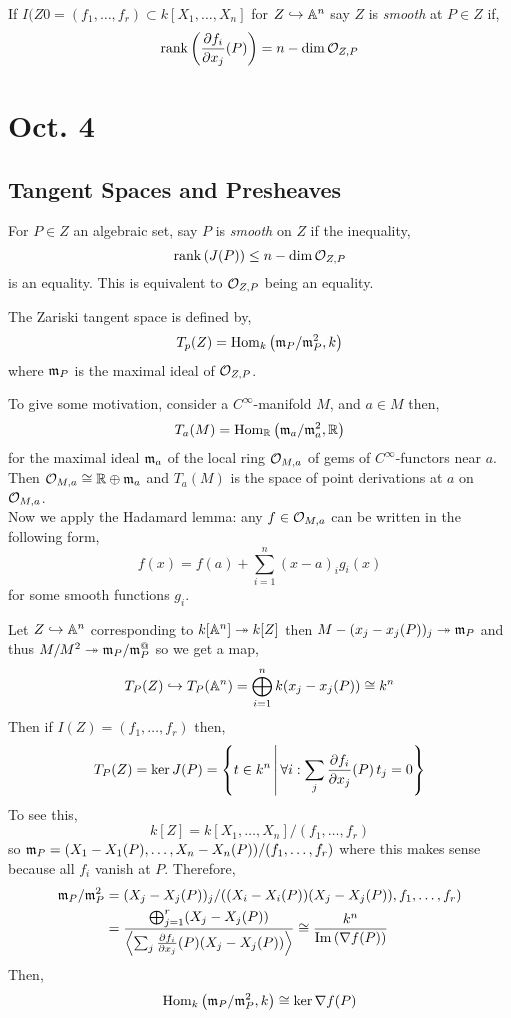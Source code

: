 \documentclass[12pt]{article}
\begin{document}
\begin{defn}
If $I(Z0 = (f_1, \dots, f_r) \subset k[X_1, \dots, X_n]$ for $Z \hookrightarrow \mathbb{A}^n$ say $Z$ is \textit{smooth} at $P \in Z$ if,
\[ \mathrm{rank} \left( \frac{\partial{f_i}}{\partial{x_j}} (P) \right) = n - \dim{ \mathcal{O}_{Z, P}} \]
\end{defn}

\section{Oct. 4}

\subsection{Tangent Spaces and Presheaves}

For $P \in Z$ an algebraic set, say $P$ is \textit{smooth} on $Z$ if the inequality,
\[ \operatorname{\mathrm{rank}}{(J(P))} \le n - \dim{\mathcal{O}_{Z, P}} \]
is an equality. This is equivalent to $\mathcal{O}_{Z, P}$ being an equality.

\begin{defn}
The Zariski tangent space is defined by,
\[ T_p(Z) = \mathrm{Hom}_{k} \left( \mathfrak{m}_P/\mathfrak{m}_P^2, k \right) \]
where $\mathfrak{m}_P$ is the maximal ideal of $\mathcal{O}_{Z, P}$.
\end{defn}

\begin{rmk}
To give some motivation, consider a $C^\infty$-manifold $M$, and $a \in M$ then,
\[ T_a(M) = \mathrm{Hom}_{\mathbb{R}} \left( \mathfrak{m}_a/\mathfrak{m}_a^2, \mathbb{R} \right) \]
for the maximal ideal $\mathfrak{m}_a$ of the local ring $\mathcal{O}_{M, a}$ of gems of $C^\infty$-functors near $a$. Then $\mathcal{O}_{M, a} \cong \mathbb{R} \oplus \mathfrak{m}_a$ and $T_a(M)$ is the space of point derivations at $a$ on $\mathcal{O}_{M, a}$.
\bigskip\\
Now we apply the Hadamard lemma: any $f \in \mathcal{O}_{M, a}$ can be written in the following form,
\[ f(x) = f(a) + \sum_{i = 1}^n (x - a)_i g_i(x) \]
for some smooth functions $g_i$.
\end{rmk}

\begin{example}
Let $Z \hookrightarrow \mathbb{A}^n$ corresponding to $k[\mathbb{A}^n] \twoheadrightarrow k[Z]$ then $M - (x_j - x_j(P))_j \twoheadrightarrow \mathfrak{m}_P$ and thus $M/M^2 \twoheadrightarrow \mathfrak{m}_P / \mathfrak{m}_P^@$ so we get a map,
\[ T_P(Z) \hookrightarrow T_P(\mathbb{A}^n) = \bigoplus_{i = 1}^n k (x_j - x_j(P)) \cong k^n \]
Then if $I(Z) = (f_1, \dots, f_r)$ then,
\[ T_P(Z) = \ker{J(P)} = \left\{ t \in k^n \, \middle| \, \forall i : \sum_{j} \frac{\partial{f_i}}{\partial{x_j}}(P) \, t_j = 0 \right\} \]
To see this,
\[ k[Z] = k[X_1, \dots, X_n]/(f_1, \dots, f_r) \]
so $\mathfrak{m}_P = (X_1 - X_1(P), \dots, X_n - X_n(P)) / (f_1, \dots, f_r)$ where this makes sense because all $f_i$ vanish at $P$. Therefore,
\begin{align*}
\mathfrak{m}_P / \mathfrak{m}_P^2 & = (X_j - X_j(P))_j / ((X_i - X_i(P))(X_j - X_j(P)), f_1, \dots, f_r)
\\
& = \frac{\bigoplus_{j = 1}^r (X_j - X_j(P))}{\left< \sum_j \frac{\partial{f_i}}{\partial{x_j}}(P) (X_j - X_j(P)) \right>} \cong \frac{k^n}{\mathrm{Im}\left( \nabla f(P) \right)}
\end{align*}
Then,
\[ \mathrm{Hom}_{k} \left( \mathfrak{m}_P/\mathfrak{m}_P^2, k \right) \cong \ker{\nabla f(P)} \]
\end{example}
\end{document}
